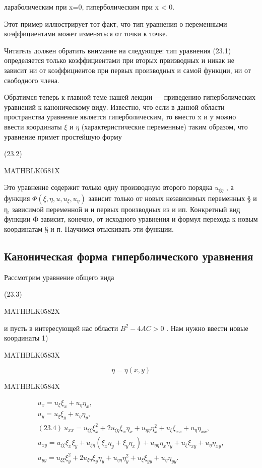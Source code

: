 \documentclass[
  ukrainian,
]{article}
\begin{document}
лараболическим при x=0, гиперболическим при x \textless{} 0.

Этот пример иллюстрирует тот факт, что тип уравнения о переменными
коэффициентами может изменяться от точки к точке.

Читатель должен обратить внимание на следующее: тип уравнения (23.1)
определяется только коэффициентами при вторых првизводных и никак не
зависит ни от коэффициентов при первых производных и самой функции, ни
от свободного члена.

Обратимся теперь к главной теме нашей лекции --- приведению
гиперболических уравнений к каноническому виду. Известно, что если в
данной области пространства уравнение является гиперболическим, то
вместо x и y можно ввести координаты \(\xi\) и \(\eta\)
(характеристические переменные) таким образом, что уравнение примет
простейшую форму

(23.2)

MATHBLK0581X

Это уравнение содержит только одну производную второго порядка
\(u_{\xi\eta}\) , а функция \(\Phi(\xi,\eta,u,u_{\xi},u_{\eta})\)
зависит только от новых независимых переменных § и η, зависимой
переменной и и первых производных из и ип. Конкретный вид функции Ф
зависит, конечно, от исходного уравнения и формул перехода к новым
координатам § и п. Научимся отыскивать эти функции.

\subsection{Каноническая форма гиперболического
уравнения}\label{ux43aux430ux43dux43eux43dux438ux447ux435ux441ux43aux430ux44f-ux444ux43eux440ux43cux430-ux433ux438ux43fux435ux440ux431ux43eux43bux438ux447ux435ux441ux43aux43eux433ux43e-ux443ux440ux430ux432ux43dux435ux43dux438ux44f-1}

Рассмотрим уравнение общего вида

(23.3)

MATHBLK0582X

и пусть в интересующей нас области \(B^2 - 4AC > 0\) . Нам нужно ввести
новые координаты 1)

MATHBLK0583X

\[
\eta = \eta(x, y)
\]

MATHBLK0584X

\[
\begin{array}{c} u_x = u_\xi \xi_x + u_\eta \eta_x, \\ u_y = u_\xi \xi_y + u_\eta \eta_y, \\ (23.4) \ u_{xx} = u_{\xi\xi} \xi_x^2 + 2u_{\xi\eta} \xi_x \eta_x + u_{\eta\eta} \eta_x^2 + u_{\xi} \xi_{xx} + u_{\eta} \eta_{xx}, \\ u_{xy} = u_{\xi\xi} \xi_x \xi_y + u_{\xi\eta} (\xi_x \eta_y + \xi_y \eta_x) + u_{\eta\eta} \eta_x \eta_y + u_{\xi} \xi_{xy} + u_{\eta} \eta_{xy}, \\ u_{yy} = u_{\xi\xi} \xi_y^2 + 2u_{\xi\eta} \xi_y \eta_y + u_{\eta\eta} \eta_y^2 + u_{\xi} \xi_{yy} + u_{\eta} \eta_{yy}. \end{array}
\]
\end{document}
